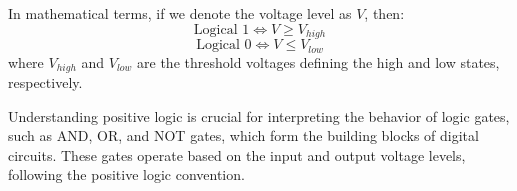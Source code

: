 In mathematical terms, if we denote the voltage level as \( V \), then:
\[
\text{Logical 1} \iff V \geq V_{high}
\]
\[
\text{Logical 0} \iff V \leq V_{low}
\]
where \( V_{high} \) and \( V_{low} \) are the threshold voltages defining the high and low states, respectively.

Understanding positive logic is crucial for interpreting the behavior of logic gates, such as AND, OR, and NOT gates, which form the building blocks of digital circuits. These gates operate based on the input and output voltage levels, following the positive logic convention.

